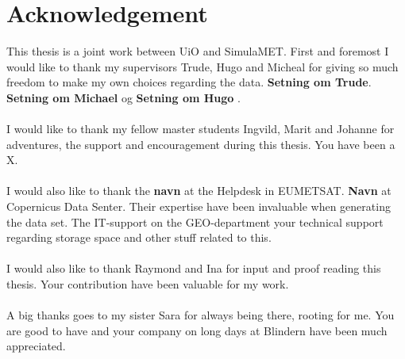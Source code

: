 \chapter*{Acknowledgement}
This thesis is a joint work between UiO and SimulaMET. First and foremost I would like to thank my supervisors Trude, Hugo and Micheal for giving so much freedom to make my own choices regarding the data. \textbf{Setning om Trude}. \textbf{Setning om Michael} og \textbf{Setning om Hugo }.
\\ \\
I would like to thank my fellow master students Ingvild, Marit and Johanne for adventures, the support and encouragement during this thesis. You have been a X.
\\ \\ 
I would also like to thank the \textbf{navn} at the Helpdesk in EUMETSAT. \textbf{Navn} at Copernicus Data Senter. Their expertise have been invaluable when generating the data set. 
The IT-support on the GEO-department your technical support regarding storage space and other stuff related to this. 
\\ \\ 
I would also like to thank Raymond and Ina for input and proof reading this thesis. Your contribution have been valuable for my work.
\\ \\
A big thanks goes to my sister Sara for always being there, rooting for me. You are good to have and your company on long days at Blindern have been much appreciated. 
\\ \\


\cleardoublepage